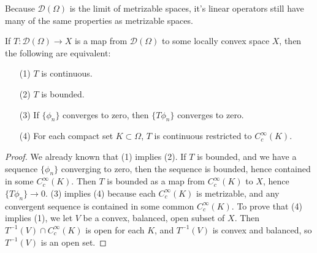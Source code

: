 Because $\mathcal{D}(\Omega)$ is the limit of metrizable spaces, it's linear operators still have many of the same properties as metrizable spaces.

\begin{theorem}
    If $T: \mathcal{D}(\Omega) \to X$ is a map from $\mathcal{D}(\Omega)$ to some locally convex space $X$, then the following are equivalent:
    \begin{itemize}
        \item[(1)] $T$ is continuous.
        \item[(2)] $T$ is bounded.
        \item[(3)] If $\{ \phi_n \}$ converges to zero, then $\{ T\phi_n \}$ converges to zero.
        \item[(4)] For each compact set $K \subset \Omega$, $T$ is continuous restricted to $C_c^\infty(K)$.
    \end{itemize}
\end{theorem}
\begin{proof}
    We already known that (1) implies (2). If $T$ is bounded, and we have a sequence $\{ \phi_n \}$ converging to zero, then the sequence is bounded, hence contained in some $C_c^\infty(K)$. Then $T$ is bounded as a map from $C_c^\infty(K)$ to $X$, hence $\{ T\phi_n \} \to 0$. (3) implies (4) because each $C_c^\infty(K)$ is metrizable, and any convergent sequence is contained in some common $C_c^\infty(K)$. To prove that (4) implies (1), we let $V$ be a convex, balanced, open subset of $X$. Then $T^{-1}(V) \cap C_c^\infty(K)$ is open for each $K$, and $T^{-1}(V)$ is convex and balanced, so $T^{-1}(V)$ is an open set.
\end{proof}

